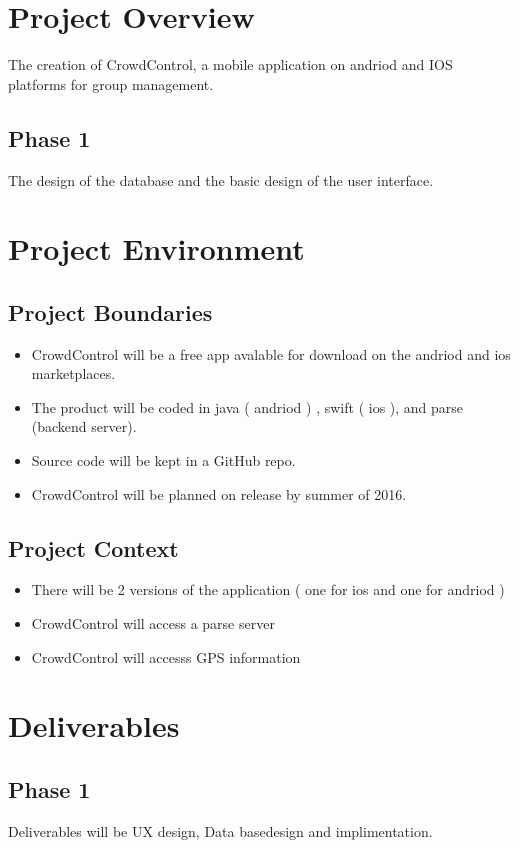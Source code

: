 \documentclass[11pt]{article}
\begin{document}
\section*{Project Overview}
The creation of CrowdControl, a mobile application on andriod and IOS platforms for group management.

\subsection*{Phase 1}
The design of the database and the basic design of the user interface.

\section*{Project Environment}

\subsection*{Project Boundaries}
	\begin{itemize}
	\item CrowdControl will be a free app avalable for download on the andriod and ios marketplaces.
	\item The product will be coded in java ( andriod ) , swift ( ios ), and parse (backend server).
	\item Source code will be kept in a GitHub repo.
	\item CrowdControl will be planned on release by summer of 2016.
	\end{itemize}
	
\subsection*{Project Context}
	\begin{itemize}
	\item There will be 2 versions of the application ( one for ios and one for andriod )
	\item CrowdControl will access a parse server
	\item CrowdControl will accesss GPS information
	\end{itemize}

\section*{Deliverables}

\subsection*{Phase 1}
Deliverables will be UX design, Data basedesign and implimentation.
\end{document}
